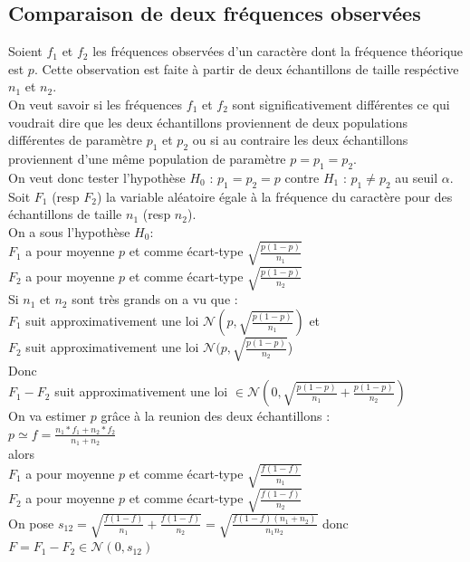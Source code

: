 \documentclass[a4paper,11pt]{book}
\begin{document}
\subsection{Comparaison de deux fr\'equences observ\'ees}\label{sec:compfreq}
Soient $f_1$ et $f_2$ les fr\'equences observ\'ees d'un caract\`ere
dont la fr\'equence th\'eorique est $p$. Cette observation est faite \`a partir
 de deux \'echantillons de taille resp\'ective $n_1$ et $n_2$.\\
On veut savoir si les fr\'equences $f_1$ et $f_2$ sont significativement 
diff\'erentes ce qui voudrait dire que les deux \'echantillons proviennent de 
deux populations diff\'erentes de param\`etre $p_1$ et $p_2$ ou si au
contraire les deux \'echantillons proviennent d'une m\^eme population  
de param\`etre $p=p_1=p_2$.\\
On veut donc tester l'hypoth\`ese $H_0$ : $p_1=p_2=p$ contre 
$H_1$ : $p_1\neq p_2$ au seuil $\alpha$.\\
 Soit $F_1$ (resp $F_2$) la variable al\'eatoire \'egale \`a la fr\'equence du 
caract\`ere pour des \'echantillons de taille $n_1$ (resp $n_2$).\\
On a sous l'hypoth\`ese $H_0$:\\
$F_1$ a pour moyenne $p$ et comme \'ecart-type $\sqrt{\frac{p(1-p)}{n_1}}$\\
$F_2$ a pour moyenne $p$ et comme \'ecart-type $\sqrt{\frac{p(1-p)}{n_2}}$\\
Si $n_1$ et $n_2$ sont tr\`es grands on a vu que :\\
$F_1$ suit approximativement une loi $\mathcal N(p,\sqrt{\frac{p(1-p)}{n_1}})$ 
et\\
$F_2 $ suit approximativement une loi $\mathcal N(p,\sqrt{\frac{p(1-p)}{n_2}}$)\\
Donc \\
$F_1-F_2 $ suit approximativement une loi $\in \mathcal N(0,\sqrt{\frac{p(1-p)}{n_1}+\frac{p(1-p)}{n_2}})$ \\
On va estimer $p$ gr\^ace \`a la reunion des deux \'echantillons :\\
$\displaystyle p \simeq f=\frac{n_1*f_1+n_2*f_2}{n_1+n_2}$\\
alors \\
$F_1$ a pour moyenne $p$ et comme \'ecart-type $\sqrt{\frac{f(1-f)}{n_1}}$\\
$F_2$ a pour moyenne $p$ et comme \'ecart-type $\sqrt{\frac{f(1-f)}{n_2}}$\\
On pose 
$\displaystyle s_{12}=\sqrt{\frac{f(1-f)}{n_1}+\frac{f(1-f)}{n_2}}=\sqrt{\frac{f(1-f)(n_1+n_2)}{n_1n_2}}$ donc\\
$\displaystyle F=F_1-F_2 \in \mathcal N(0,s_{12})$ \\
\end{document}
